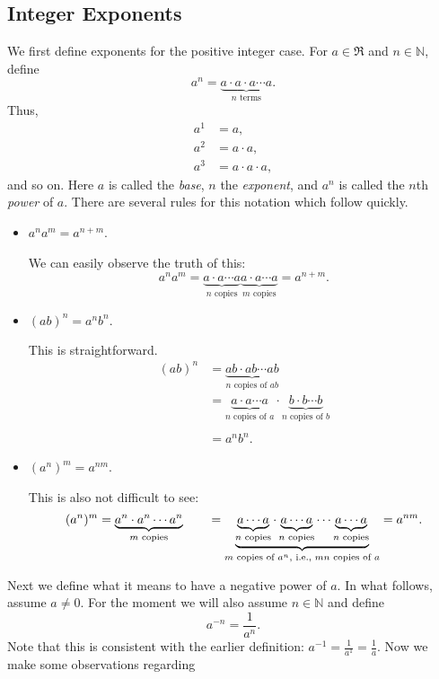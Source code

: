 \subsection{Integer Exponents}

We first define exponents for the positive
integer case.  For $a\in\Re$ and $n\in\mathbb{N}$,
define
\begin{equation}
a^n=\underbrace{a\cdot a\cdot a\cdots a}_{n \text{\ terms}}.\end{equation}
Thus,
\begin{align*}
a^1&=a,\\ a^2&=a\cdot a,\\ a^3&=a\cdot a\cdot a,\end{align*}
and so on.
Here $a$ is called the {\it base}, $n$ the {\it exponent},
and $a^n$ is called the $n$th {\it power} of $a$. There are
several rules for this notation which follow quickly.
\begin{itemize}
\item $a^na^m=a^{n+m}$.

We can easily observe the truth of this:
$$a^na^m=\underbrace{a\cdot a\cdots a}_{n\text{ copies}}
\underbrace{a\cdot a\cdots a}_{m\text{ copies}}
=a^{n+m}.$$

\item $(ab)^n=a^nb^n.$

This is straightforward.
\begin{align*}(ab)^n&=\underbrace{ab\cdot ab\cdots ab}_{n\text{\ copies of }
 ab}\\
&=\underbrace{a\cdot a\cdots a}_{n\text{\ copies of }a}\cdot
\underbrace{b\cdot b\cdots b}_{n\text{\ copies of } b}\\
\\
&=a^nb^n.\end{align*}
\item $(a^n)^m=a^{nm}$.

This is also not difficult to see:
$$(a^n)^m=\underbrace{a^n\cdot a^n\cdots a^n}_{m \text{ copies}}
\qquad
=\underbrace{\underbrace{a\cdots a}_{n\text{ copies}}
\cdot\underbrace{a\cdots a}_{n\text{ copies}}
\cdots\underbrace{a\cdots a}_{n\text{ copies}}}_%
{m\text{ copies of }a^n,\text{ i.e., } mn\text{ copies of }a}=a^{nm}.$$
\end{itemize}
Next we define what it means to have a negative power
of $a$.  In what follows, assume $a\ne0$.
For the moment we will also assume $n\in\mathbb{N}$ and define
$$a^{-n}=\frac1{a^n}.$$
Note that this is consistent with the earlier definition:
$a^{-1}=\frac1{a^1}=\frac1a$.  Now we make some observations regarding
